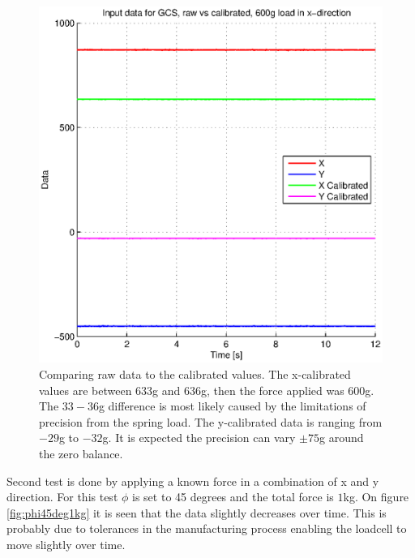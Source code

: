 \begin{figure}[H]
\centering
\includegraphics[scale=1]{graphics/gcs_test/calib_result_compare.eps}
\caption[Comparing raw data to the calibrated values]{Comparing raw data to the calibrated values. The x-calibrated values are between $633$g and $636$g, then the force applied was $600$g. The $33-36$g difference is most likely caused by the limitations of precision from the spring load. The y-calibrated data is ranging from $-29$g to $-32$g. It is expected the precision can vary $\pm75$g around the zero balance.}
\end{figure}

\noindent
Second test is done by applying a known force in a combination of x and y direction. For this test $\phi$ is set to 45 degrees and the total force is $1$kg. On figure \ref{fig:phi45deg1kg} it is seen that the data slightly decreases over time. This is probably due to tolerances in the manufacturing process enabling the loadcell to move slightly over time.

